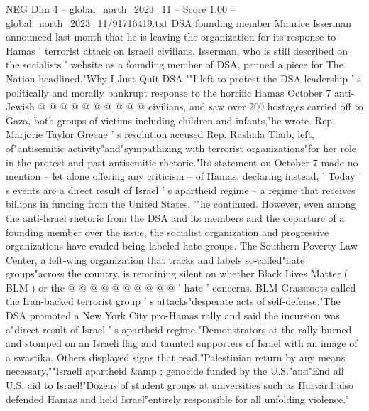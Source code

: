\begin{textsample}{NEG Dim 4 – global\_north\_2023\_11 – Score 1.00 – global\_north\_2023\_11/91716419.txt}
DSA founding member Maurice Isserman announced last month that he is leaving the organization for its response to Hamas ' terrorist attack on Israeli civilians.
Isserman, who is still described on the socialists ' website as a founding member of DSA, penned a piece for The Nation headlined,"Why I Just Quit DSA.""I left to protest the DSA leadership ' s politically and morally bankrupt response to the horrific Hamas October 7 anti-Jewish @ @ @ @ @ @ @ @ @ @ civilians, and saw over 200 hostages carried off to Gaza, both groups of victims including children and infants,"he wrote.
Rep.
Marjorie Taylor Greene ' s resolution accused Rep.
Rashida Tlaib, left, of"antisemitic activity"and"sympathizing with terrorist organizations"for her role in the protest and past antisemitic rhetoric."Its statement on October 7 made no mention -- let alone offering any criticism -- of Hamas, declaring instead, ' Today ' s events are a direct result of Israel ' s apartheid regime -- a regime that receives billions in funding from the United States, '"he continued.
However, even among the anti-Israel rhetoric from the DSA and its members and the departure of a founding member over the issue, the socialist organization and progressive organizations have evaded being labeled hate groups.
The Southern Poverty Law Center, a left-wing organization that tracks and labels so-called"hate groups"across the country, is remaining silent on whether Black Lives Matter ( BLM ) or the @ @ @ @ @ @ @ @ @ @ ' hate ' concerns.
BLM Grassroots called the Iran-backed terrorist group ' s attacks"desperate acts of self-defense."The DSA promoted a New York City pro-Hamas rally and said the incursion was a"direct result of Israel ' s apartheid regime."Demonstrators at the rally burned and stomped on an Israeli flag and taunted supporters of Israel with an image of a swastika.
Others displayed signs that read,"Palestinian return by any means necessary,""Israeli apartheid \&amp ; genocide funded by the U.S."and"End all U.S. aid to Israel!"Dozens of student groups at universities such as Harvard also defended Hamas and held Israel"entirely responsible for all unfolding violence."

\end{textsample}

